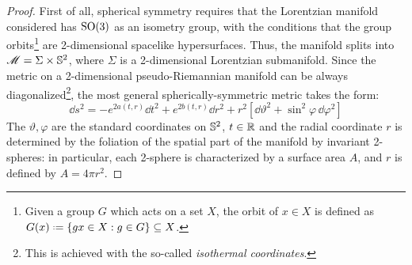 \begin{proofbox}
  \begin{proof}
    First of all, spherical symmetry requires that the Lorentzian manifold considered has $ \mathrm{SO}(3) $ as an isometry group, with the conditions that the group orbits\footnote{Given a group $ G $ which acts on a set $ X $, the orbit of $ x \in X $ is defined as $ G(x) \defeq \{g x \in X : g \in G\} \ssq X $.} are 2-dimensional spacelike hypersurfaces. Thus, the manifold splits into $ \mathscr{M} = \Sigma \times \mathbb{S}^{2} $, where $ \Sigma $ is a 2-dimensional Lorentzian submanifold. Since the metric on a 2-dimensional pseudo-Riemannian manifold can be always diagonalized\footnote{This is achieved with the so-called \emph{isothermal coordinates}.}, the most general spherically-symmetric metric takes the form:
    \begin{equation*}
      \dd s^2 = - e^{2a(t,r)} \dd t^2 + e^{2b(t,r)} \dd r^2 + r^2 \left[ \dd \vartheta^2 + \sin^2 \varphi \, \dd \varphi^2 \right]
    \end{equation*}
    The $ \vartheta , \varphi $ are the standard coordinates on $ \mathbb{S}^{2} $, $ t \in \mathbb{R} $ and the radial coordinate $ r $ is determined by the foliation of the spatial part of the manifold by invariant 2-spheres: in particular, each 2-sphere is characterized by a surface area $ A $, and $ r $ is defined by $ A = 4\pi r^2 $.


\end{proof}
\end{proofbox}

